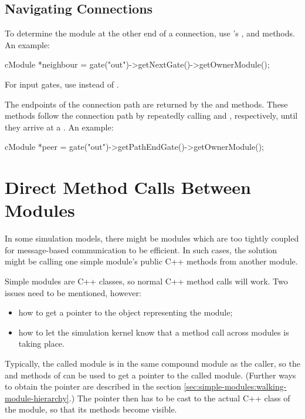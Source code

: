 \subsection{Navigating Connections}
\label{sec:simple-modules:navigating-connections}

To determine the module at the other end of a connection, use
's ,  and
 methods. An example:

\begin{cpp}
cModule *neighbour = gate("out")->getNextGate()->getOwnerModule();
\end{cpp}

For input gates, use  instead of .

The endpoints of the connection path are returned by the
 and  
methods. These methods follow the connection path by repeatedly calling
 and , respectively,
until they arrive at a . An example:

\begin{cpp}
cModule *peer = gate("out")->getPathEndGate()->getOwnerModule();
\end{cpp}


\section{Direct Method Calls Between Modules}
\label{sec:simple-modules:direct-method-calls}

In some simulation models, there might be modules which are too
tightly coupled for message-based communication to be efficient.
In such cases, the solution might be calling one simple module's public
C++ methods from another module.

Simple modules are C++ classes, so normal C++ method calls will
work. Two issues need to be mentioned, however:

\begin{itemize}
  \item how to get a pointer to the object representing the module;
  \item how to let the simulation kernel know that a method call across modules
     is taking place.
\end{itemize}

Typically, the called module is in the same compound module as the caller,
so the  and  methods of
 can be used to get a  pointer to the
called module. (Further ways to obtain the pointer are described
in the section \ref{sec:simple-modules:walking-module-hierarchy}.)
The  pointer then has to be cast to the actual C++ class
of the module, so that its methods become visible.


